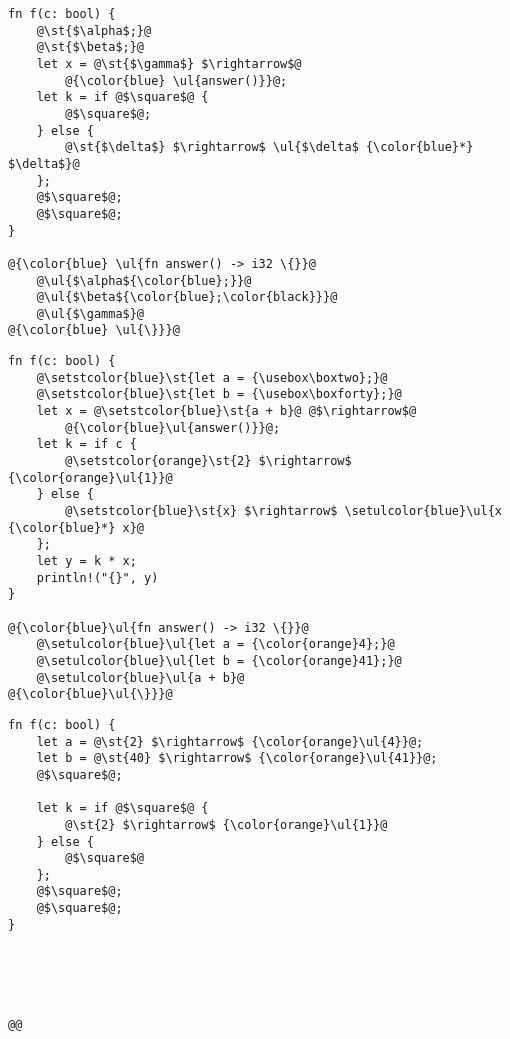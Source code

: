 \documentclass[a4paper,10pt]{article}
\begin{document}
\noindent
\begin{minipage}{.32\textwidth}
\begin{lstlisting}[rulecolor=\color{blue!20}]
fn f(c: bool) {
    @\st{$\alpha$;}@
    @\st{$\beta$;}@
    let x = @\st{$\gamma$} $\rightarrow$@
        @{\color{blue} \ul{answer()}}@;
    let k = if @$\square$@ {
        @$\square$@;
    } else {
        @\st{$\delta$} $\rightarrow$ \ul{$\delta$ {\color{blue}*} $\delta$}@
    };
    @$\square$@;
    @$\square$@;
}

@{\color{blue} \ul{fn answer() -> i32 \{}}@
    @\ul{$\alpha${\color{blue};}}@
    @\ul{$\beta${\color{blue};\color{black}}}@
    @\ul{$\gamma$}@
@{\color{blue} \ul{\}}}@
\end{lstlisting}
\end{minipage}\hfill
\begin{minipage}{.32\textwidth}
\newbox\boxtwo
\sbox{}
\newbox\boxforty
\sbox{}
\begin{lstlisting}
fn f(c: bool) {
    @\setstcolor{blue}\st{let a = {\usebox\boxtwo};}@
    @\setstcolor{blue}\st{let b = {\usebox\boxforty};}@
    let x = @\setstcolor{blue}\st{a + b}@ @$\rightarrow$@
        @{\color{blue}\ul{answer()}}@;
    let k = if c {
        @\setstcolor{orange}\st{2} $\rightarrow$ {\color{orange}\ul{1}}@
    } else {
        @\setstcolor{blue}\st{x} $\rightarrow$ \setulcolor{blue}\ul{x {\color{blue}*} x}@
    };
    let y = k * x;
    println!("{}", y)
}

@{\color{blue}\ul{fn answer() -> i32 \{}}@
    @\setulcolor{blue}\ul{let a = {\color{orange}4};}@
    @\setulcolor{blue}\ul{let b = {\color{orange}41};}@
    @\setulcolor{blue}\ul{a + b}@
@{\color{blue}\ul{\}}}@
\end{lstlisting}
\end{minipage}\hfill
\begin{minipage}{.32\textwidth}
\begin{lstlisting}[rulecolor=\color{orange!30}]
fn f(c: bool) {
    let a = @\st{2} $\rightarrow$ {\color{orange}\ul{4}}@;
    let b = @\st{40} $\rightarrow$ {\color{orange}\ul{41}}@;
    @$\square$@;

    let k = if @$\square$@ {
        @\st{2} $\rightarrow$ {\color{orange}\ul{1}}@
    } else {
        @$\square$@
    };
    @$\square$@;
    @$\square$@;
}





@@
\end{lstlisting}
\end{minipage}\hfill
\vspace{-.4cm}
\begin{lstlisting}[label=lst:overview_diffs, caption={Left (resp. right) represent the difference between original source code and blue commit (resp. orange commit). Center is the syntactic fusion of these two differences.}]
\end{lstlisting}
\end{document}
